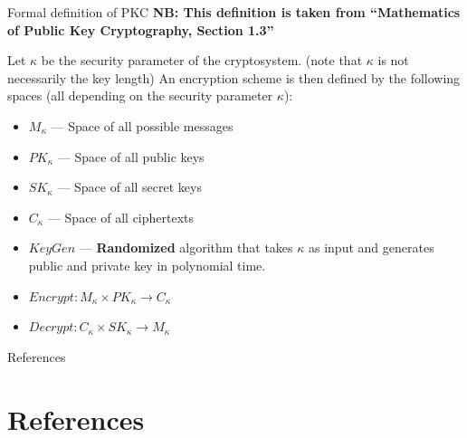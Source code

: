 \documentclass{beamer}
\begin{document}
\begin{frame}{Formal definition of PKC}
    \textbf{NB: This definition is taken from ``Mathematics of Public Key Cryptography, Section 1.3''} 
    \begin{definition}
        Let $\kappa$ be the security parameter of the cryptosystem. (note that 
        $\kappa$ is not necessarily the key length) An encryption scheme is then 
        defined by the following spaces (all depending on the security parameter 
        $\kappa$):
        \begin{itemize}
            \item $M_\kappa$ --- Space of all possible messages
            \item $PK_\kappa$ --- Space of all public keys
            \item $SK_\kappa$ --- Space of all secret keys
            \item $C_\kappa$ --- Space of all ciphertexts
            \item $KeyGen$ --- \textbf{Randomized} algorithm that takes $\kappa$ as input and generates
            public and private key in polynomial time. 
            \item $Encrypt : M_\kappa \times PK_\kappa \to C_\kappa$ 
            \item $Decrypt : C_\kappa \times SK_\kappa \to M_\kappa$
        \end{itemize}
    \end{definition}
\end{frame}


\begin{frame}[shrink=30]{References}
	\section*{References}
    \printbibliography
\end{frame}
\end{document}
